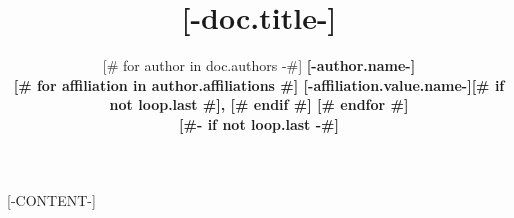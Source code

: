 \documentclass{article}
\title{[-doc.title-]}
\author{[# for author in doc.authors -#]
\bfseries [-author.name-]\mdseries\\
[#- if author.affiliations #]
[# for affiliation in author.affiliations #]
[-affiliation.value.name-][# if not loop.last #], [# endif #]
[# endfor #]\\
[#- endif -#]
[#- if not loop.last -#]
\AND
[#- endif -#]
[#- endfor -#]
}
\date{\displaydate{articleDate}}
\begin{document}
\maketitle

[-CONTENT-]
\end{document}
